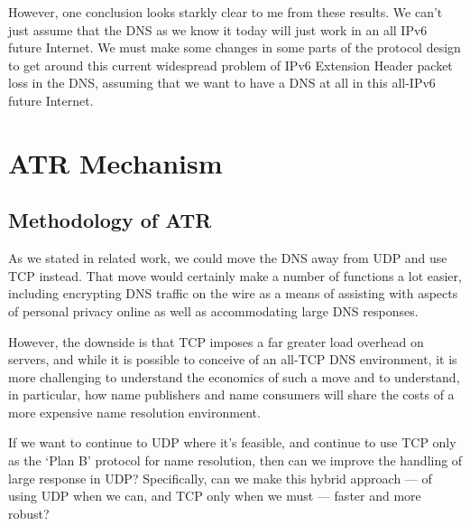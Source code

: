 




However, one conclusion looks starkly clear to me from these results. We can’t just assume that the DNS as we know it today will just work in an all IPv6 future Internet. We must make some changes in some parts of the protocol design to get around this current widespread problem of IPv6 Extension Header packet loss in the DNS, assuming that we want to have a DNS at all in this all-IPv6 future Internet.

\section{ATR Mechanism}

\subsection{Methodology of ATR}

As we stated in related work, we could move the DNS away from UDP and use TCP instead. That move would certainly make a number of functions a lot easier, including encrypting DNS traffic on the wire as a means of assisting with aspects of personal privacy online as well as accommodating large DNS responses.

However, the downside is that TCP imposes a far greater load overhead on servers, and while it is possible to conceive of an all-TCP DNS environment, it is more challenging to understand the economics of such a move and to understand, in particular, how name publishers and name consumers will share the costs of a more expensive name resolution environment.

If we want to continue to UDP where it’s feasible, and continue to use TCP only as the ‘Plan B’ protocol for name resolution, then can we improve the handling of large response in UDP? Specifically, can we make this hybrid approach — of using UDP when we can, and TCP only when we must — faster and more robust?

